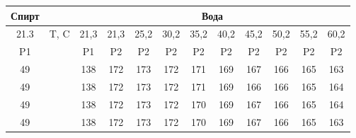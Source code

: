 \begin{center}
\begin{table}[h!]
\centering
\begin{tabular}{|c||c||c|c|c|c|c|c|c|c|c|c|}
\hline
Спирт                  & \multicolumn{1}{l|}{}         & \multicolumn{10}{c|}{Вода}                                                                                                                                                                                                                    \\ \hline
21.3                   & T, C                          & 21,3                  & 21,3                  & 25,2                  & 30,2                  & 35,2                  & 40,2                  & 45,2                  & 50,2                  & 55,2                  & 60,2                  \\ \hline
\hline
P1                &                               & P1                    & P2                    & P2                    & P2                    & P2                    & P2                    & P2                    & P2                    & P2                    & P2                    \\ \hline
49                     &                               & 138                   & 172                   & 173                   & 172                   & 171                   & 169                   & 167                   & 166                   & 165                   & 163                   \\ \hline
49                     &                               & 138                   & 172                   & 173                   & 172                   & 171                   & 169                   & 166                   & 166                   & 165                   & 164                   \\ \hline
49                     &                               & 138                   & 172                   & 173                   & 172                   & 170                   & 169                   & 167                   & 166                   & 165                   & 164                   \\ \hline
49                     &                               & 138                   & 172                   & 173                   & 172                   & 170                   & 169                   & 167                   & 166                   & 165                   & 163                   \\ \hline

\end{tabular}
\end{table}
\end{center}
